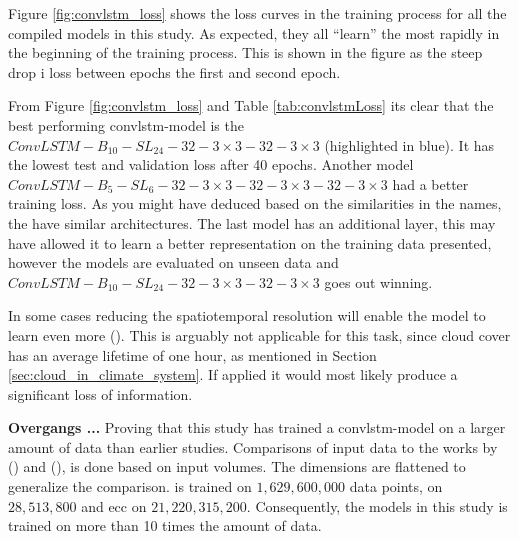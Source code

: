 Figure \ref{fig:convlstm_loss} shows the loss curves in the training process for all the compiled models in this study. As expected, they all ``learn'' the most rapidly in the beginning of the training process. This is shown in the figure as the steep drop i loss between epochs the first and second epoch. 


From Figure \ref{fig:convlstm_loss} and Table \ref{tab:convlstmLoss}  its clear that the best performing \acrshort{convlstm}-model is the $ConvLSTM-B_{10}-SL_{24}-32-3\times3-32-3 \times3$ (highlighted in blue). It has the lowest test and validation loss after 40 epochs. Another model $ConvLSTM-B_{5}-SL_{6}-32-3\times3-32-3 \times3-32-3 \times3$ had a better training loss. As you might have deduced based on the similarities in the names, the have similar architectures.
The last model has an additional layer, this may have allowed it to learn a better representation on the training data presented, however the models are evaluated on unseen data and $ConvLSTM-B_{10}-SL_{24}-32-3\times3-32-3 \times3$ goes out winning.

In some cases reducing the spatiotemporal resolution will enable the model to learn even more (\cite{precip_nowcasting}). This is arguably not applicable for this task, since cloud cover has an average lifetime of one hour, as mentioned in Section \ref{sec:cloud_in_climate_system}. If applied it would most likely produce a significant loss of information.

\textbf{Overgangs ...}
Proving that this study has trained a \acrshort{convlstm}-model on a larger amount of data than earlier studies. Comparisons of input data to the works by \citeauthor{precip_nowcasting} (\citeyear{precip_nowcasting}) and \citeauthor{SunAirLSTM} (\citeyear{SunAirLSTM}), is done based on input volumes. The dimensions are flattened to generalize the comparison.  is trained on $1,629,600,000$ data points,  on $28,513,800$ and \acrshort{ecc} on $21,220,315,200$. Consequently, the models in this study is trained on more than 10 times the amount of data.

